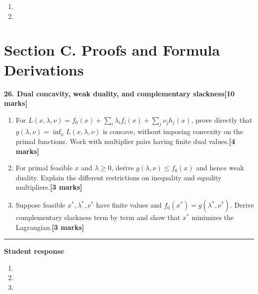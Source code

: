 \documentclass[11pt,a4paper]{article}
\newlength{\BlankAnswerHeight}\setlength{\BlankAnswerHeight}{16mm}
\newcommand{\AnswerBlank}{\leavevmode\par\vspace{\BlankAnswerHeight}}
\begin{document}
\begin{enumerate}[label=(\alph*),leftmargin=8mm,itemsep=3pt]
\item
\AnswerBlank
\item
\AnswerBlank
\end{enumerate}
\newpage\section*{Section C. Proofs and Formula Derivations}
\textbf{26. Dual concavity, weak duality, and complementary slackness}\hfill\textbf{[10 marks]}\par\medskip
\begin{enumerate}[label=(\alph*),leftmargin=8mm,itemsep=3pt]
\item For \(L(x,\lambda,\nu)=f_0(x)+\sum_i\lambda_if_i(x)+\sum_j\nu_jh_j(x)\), prove directly that \(g(\lambda,\nu)=\inf_x L(x,\lambda,\nu)\) is concave, without imposing convexity on the primal functions. Work with multiplier pairs having finite dual values.\hfill\textbf{[4 marks]}
\item For primal feasible \(x\) and \(\lambda\ge0\), derive \(g(\lambda,\nu)\le f_0(x)\) and hence weak duality. Explain the different restrictions on inequality and equality multipliers.\hfill\textbf{[3 marks]}
\item Suppose feasible \(x^*,\lambda^*,\nu^*\) have finite values and \(f_0(x^*)=g(\lambda^*,\nu^*)\). Derive complementary slackness term by term and show that \(x^*\) minimizes the Lagrangian.\hfill\textbf{[3 marks]}
\end{enumerate}\par\medskip\hrule\medskip\textbf{Student response}\par
\begin{enumerate}[label=(\alph*),leftmargin=8mm,itemsep=3pt]
\item
\AnswerBlank
\item
\AnswerBlank
\item
\AnswerBlank
\end{enumerate}
\end{document}
